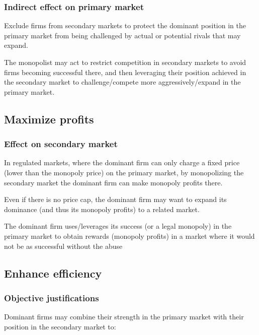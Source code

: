     \subsubsection*{Indirect effect on primary market}

        Exclude firms from secondary markets to protect the dominant position in the primary market from being challenged by actual or potential rivals that may expand. 
        
        The monopolist may act to restrict competition in secondary markets to avoid firms becoming successful there, and then leveraging their position achieved in the secondary market to challenge/compete more aggressively/expand in the primary market.

    \subsection{Maximize profits}
    \subsubsection*{Effect on secondary market}

        In regulated markets, where the dominant firm can only charge a fixed price (lower than the monopoly price) on the primary market, by monopolizing the secondary market the dominant firm can make monopoly profits there.
        
        Even if there is no price cap, the dominant firm may want to expand its dominance (and thus its monopoly profits) to a related market. 
        
        The dominant firm uses/leverages its success (or a legal monopoly) in the primary market to obtain rewards (monopoly profits) in a market where it would not be as successful without the abuse


    \subsection{Enhance efficiency}
    \subsubsection*{Objective justifications}

        Dominant firms may combine their strength in the primary market with their position in the secondary market to:
        
